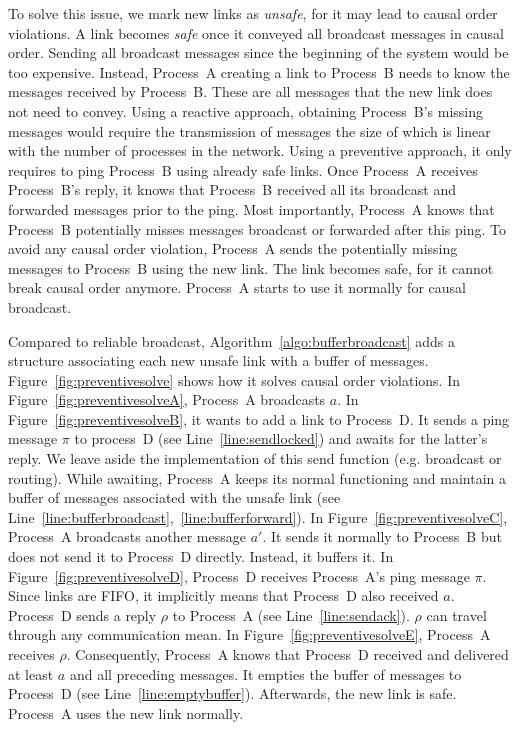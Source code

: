 To solve this issue, we mark new links as \emph{unsafe}, for it may lead to
causal order violations. A link becomes \emph{safe} once it conveyed all
broadcast messages in causal order.
Sending all broadcast messages since the beginning of the system would be too
expensive. Instead, Process~A creating a link to Process~B needs to know the
messages received by Process~B. These are all messages that the new link does
not need to convey.
Using a reactive approach, obtaining Process~B's missing messages would require
the transmission of messages the size of which is linear with the number of
processes in the network. Using a preventive approach, it only requires to ping
Process~B using already safe links. Once Process~A receives Process~B's reply,
it knows that Process~B received all its broadcast and forwarded messages prior
to the ping. Most importantly, Process~A knows that Process~B potentially misses
messages broadcast or forwarded after this ping.  To avoid any causal order
violation, Process~A sends the potentially missing messages to Process~B using
the new link. The link becomes safe, for it cannot break causal order
anymore. Process~A starts to use it normally for causal broadcast.



Compared to reliable broadcast, Algorithm~\ref{algo:bufferbroadcast} adds a
structure associating each new unsafe link with a buffer of
messages. Figure~\ref{fig:preventivesolve} shows how it solves causal order
violations. In Figure~\ref{fig:preventivesolveA}, Process~A broadcasts $a$.  In
Figure~\ref{fig:preventivesolveB}, it wants to add a link to Process~D. It sends
a ping message $\pi$ to process~D (see Line~\ref{line:sendlocked}) and awaits
for the latter's reply.  We leave aside the implementation of this send function
(e.g. broadcast or routing). %
While awaiting, Process~A keeps its normal functioning and maintain a buffer of
messages associated with the unsafe link (see
Line~\ref{line:bufferbroadcast},~\ref{line:bufferforward}). In
Figure~\ref{fig:preventivesolveC}, Process~A broadcasts another message $a'$. It
sends it normally to Process~B but does not send it to Process~D
directly. Instead, it buffers it. In Figure~\ref{fig:preventivesolveD},
Process~D receives Process~A's ping message $\pi$. Since links are FIFO, it
implicitly means that Process~D also received $a$. Process~D sends a reply
$\rho$ to Process~A (see Line~\ref{line:sendack}). $\rho$ can travel through any
communication mean. In Figure~\ref{fig:preventivesolveE}, Process~A receives
$\rho$. Consequently, Process~A knows that Process~D received and delivered at
least $a$ and all preceding messages. It empties the buffer of messages to
Process~D (see Line~\ref{line:emptybuffer}). Afterwards, the new link is
safe. Process~A uses the new link normally.


